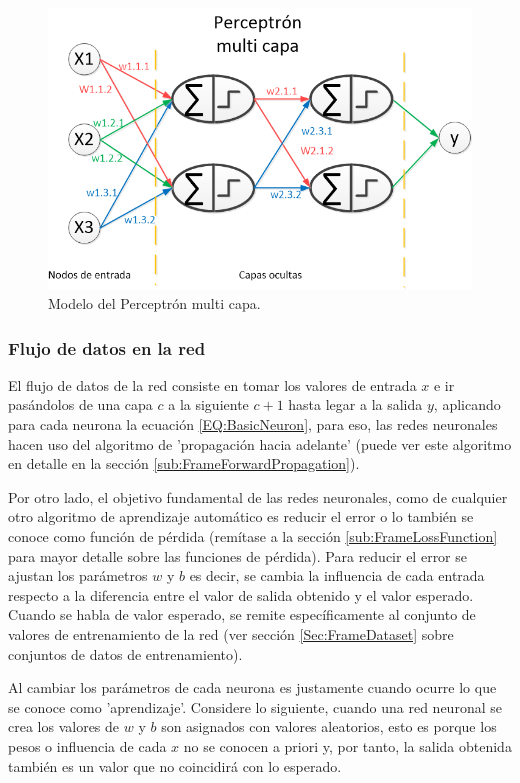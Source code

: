             \begin{figure}[ht!]
            	\centering
            	\includegraphics[width=0.6\linewidth]{imgs/02-Referential/02-PerceptronMulticapa.png}
            	\caption[Modelo del Perceptrón multi capa]{Modelo del Perceptrón multi capa.}
        	    \label{fig:PerceptronMulti}
            \end{figure}%
            
        \subsubsection{Flujo de datos en la red}
        \label{sub2:FrameNNDataFlow}
            
            El flujo de datos de la red consiste en tomar los valores de entrada $x$ e ir pasándolos de una capa $c$ a la siguiente $c + 1$ hasta legar a la salida $y$, aplicando para cada neurona la ecuación \ref{EQ:BasicNeuron}, para eso, las redes neuronales hacen uso del algoritmo de 'propagación hacia adelante' (puede ver este algoritmo en detalle en la sección \ref{sub:FrameForwardPropagation}). 
            
            Por otro lado, el objetivo fundamental de las redes neuronales, como de cualquier otro algoritmo de aprendizaje automático es reducir el error o lo también se conoce como función de pérdida  (remítase a la sección \ref{sub:FrameLossFunction} para mayor detalle sobre las funciones de pérdida). Para reducir el error se ajustan los parámetros $w$ y $b$ es decir, se cambia la influencia de cada entrada respecto a la diferencia entre el valor de salida obtenido y el valor esperado. Cuando se habla de valor esperado, se remite específicamente al conjunto de valores de entrenamiento de la red (ver sección \ref{Sec:FrameDataset} sobre conjuntos de datos de entrenamiento).
            
            Al cambiar los parámetros de cada neurona es justamente cuando ocurre lo que se conoce como 'aprendizaje'. Considere lo siguiente, cuando una red neuronal se crea los valores de $w$ y $b$ son asignados con valores aleatorios, esto es porque los pesos o influencia de cada $x$ no se conocen a priori y, por tanto, la salida obtenida también es un valor que no coincidirá con lo esperado. 
            
